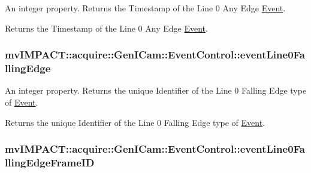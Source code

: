 An integer property. Returns the Timestamp of the Line 0 Any Edge \hyperlink{classmv_i_m_p_a_c_t_1_1acquire_1_1_event}{Event}. 

Returns the Timestamp of the Line 0 Any Edge \hyperlink{classmv_i_m_p_a_c_t_1_1acquire_1_1_event}{Event}. \hypertarget{classmv_i_m_p_a_c_t_1_1acquire_1_1_gen_i_cam_1_1_event_control_ac9895811cc7c03c7bda68e39be39e576}{
\subsubsection[{event\+Line0\+Falling\+Edge}]{ mv\+I\+M\+P\+A\+C\+T\+::acquire\+::\+Gen\+I\+Cam\+::\+Event\+Control\+::event\+Line0\+Falling\+Edge}}\label{classmv_i_m_p_a_c_t_1_1acquire_1_1_gen_i_cam_1_1_event_control_ac9895811cc7c03c7bda68e39be39e576}


An integer property. Returns the unique Identifier of the Line 0 Falling Edge type of \hyperlink{classmv_i_m_p_a_c_t_1_1acquire_1_1_event}{Event}. 

Returns the unique Identifier of the Line 0 Falling Edge type of \hyperlink{classmv_i_m_p_a_c_t_1_1acquire_1_1_event}{Event}. \hypertarget{classmv_i_m_p_a_c_t_1_1acquire_1_1_gen_i_cam_1_1_event_control_a62f1419fa2926fbde3514c3b8c670541}{
\subsubsection[{event\+Line0\+Falling\+Edge\+Frame\+I\+D}]{ mv\+I\+M\+P\+A\+C\+T\+::acquire\+::\+Gen\+I\+Cam\+::\+Event\+Control\+::event\+Line0\+Falling\+Edge\+Frame\+I\+D}}\label{classmv_i_m_p_a_c_t_1_1acquire_1_1_gen_i_cam_1_1_event_control_a62f1419fa2926fbde3514c3b8c670541}


